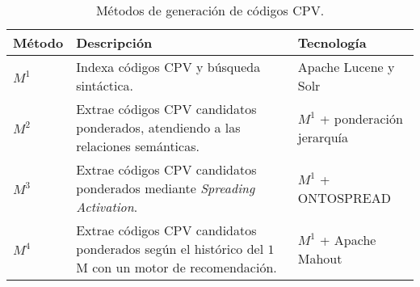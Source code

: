 \documentclass[a4paper,final,11pt,fleqn,twoside]{book}  %
\begin{document}
\begin{table}[!t]
  \centering
\caption{Métodos de generación de códigos CPV.}\label{table:metodos-ir}   
\begin{tabular}[!t]{|l|p{4cm}|p{2cm}|} 
\hline  
\textbf{Método} &  \textbf{Descripción} &  \textbf{Tecnología} \\\hline
$M^1$ & Indexa códigos CPV y búsqueda sintáctica. & Apache Lucene y Solr \\ \hline
$M^2$ & Extrae códigos CPV candidatos ponderados, atendiendo a las relaciones semánticas. & $M^1$ + ponderación jerarquía \\ \hline
$M^3$ & Extrae códigos CPV candidatos ponderados mediante \textit{Spreading Activation}. & $M^1$ + ONTOSPREAD \\ \hline
$M^4$ & Extrae códigos CPV candidatos ponderados según el histórico del $1$ M con un motor de recomendación. & $M^1$ + Apache Mahout \\ \hline
\hline
 \end{tabular}
   \end{table} 
\end{document}
